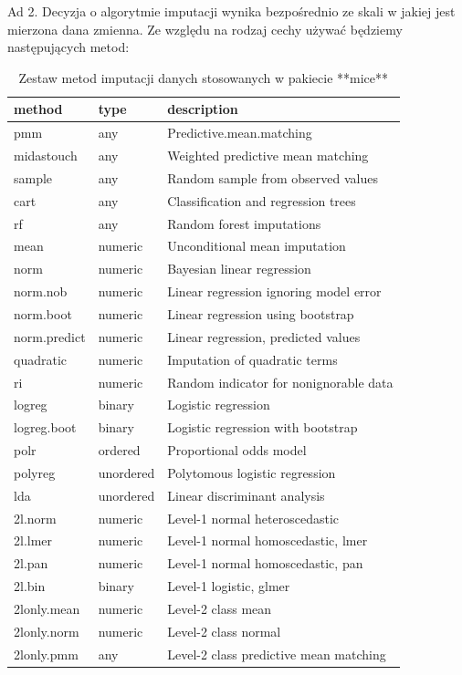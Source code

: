 \documentclass[]{book}
\theoremstyle{plain}
\theoremstyle{definition}
\theoremstyle{definition}
\theoremstyle{definition}
\theoremstyle{definition}
\theoremstyle{remark}
\begin{document}
Ad 2. Decyzja o algorytmie imputacji wynika bezpośrednio ze skali w jakiej jest mierzona dana zmienna. Ze względu na rodzaj cechy używać będziemy następujących metod:

\begin{table}[t]

\caption{\label{tab:methods}Zestaw metod imputacji danych stosowanych w pakiecie **mice**}
\centering
\begin{tabular}{lll}
\toprule
method & type & description\\
\midrule
pmm & any & Predictive.mean.matching\\
midastouch & any & Weighted predictive mean matching\\
sample & any & Random sample from observed values\\
cart & any & Classification and regression trees\\
rf & any & Random forest imputations\\
\addlinespace
mean & numeric & Unconditional mean imputation\\
norm & numeric & Bayesian linear regression\\
norm.nob & numeric & Linear regression ignoring model error\\
norm.boot & numeric & Linear regression using bootstrap\\
norm.predict & numeric & Linear regression, predicted values\\
\addlinespace
quadratic & numeric & Imputation of quadratic terms\\
ri & numeric & Random indicator for nonignorable data\\
logreg & binary & Logistic regression\\
logreg.boot & binary & Logistic regression with bootstrap\\
polr & ordered & Proportional odds model\\
\addlinespace
polyreg & unordered & Polytomous logistic regression\\
lda & unordered & Linear discriminant analysis\\
2l.norm & numeric & Level-1 normal heteroscedastic\\
2l.lmer & numeric & Level-1 normal homoscedastic,
                                lmer\\
2l.pan & numeric & Level-1 normal homoscedastic, pan\\
\addlinespace
2l.bin & binary & Level-1 logistic, glmer\\
2lonly.mean & numeric & Level-2 class mean\\
2lonly.norm & numeric & Level-2 class normal\\
2lonly.pmm & any & Level-2 class predictive mean matching\\
\bottomrule
\end{tabular}
\end{table}
\end{document}
